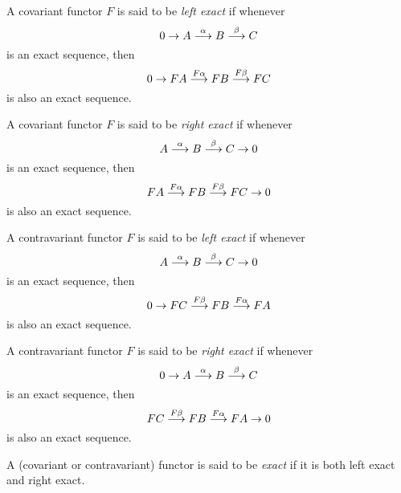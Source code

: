 \documentclass[12pt]{article}
\begin{document}
A covariant functor $F$ is said to be {\it left exact} if whenever
$$0 \to A \buildrel \alpha \over \longrightarrow B \buildrel \beta \over \longrightarrow C$$
is an exact sequence, then 
$$0 \to FA \buildrel F\alpha \over \longrightarrow FB \buildrel F\beta \over \longrightarrow FC$$
is also an exact sequence.

A covariant functor $F$ is said to be {\it right exact} if whenever
$$A \buildrel \alpha \over \longrightarrow B \buildrel \beta \over \longrightarrow C \to 0$$
is an exact sequence, then
$$FA \buildrel F\alpha \over \longrightarrow FB \buildrel F\beta \over \longrightarrow FC \to 0$$
is also an exact sequence.

A contravariant functor $F$ is said to be {\it left exact} if whenever
$$A \buildrel \alpha \over \longrightarrow B \buildrel \beta \over \longrightarrow C \to 0$$
is an exact sequence, then
$$0 \to FC \buildrel F\beta \over \longrightarrow FB \buildrel F\alpha \over \longrightarrow FA$$
is also an exact sequence.

A contravariant functor $F$ is said to be {\it right exact} if whenever
$$0 \to A \buildrel \alpha \over \longrightarrow B \buildrel \beta \over \longrightarrow C$$
is an exact sequence, then
$$FC \buildrel F\beta \over \longrightarrow FB \buildrel F\alpha \over \longrightarrow FA \to 0$$
is also an exact sequence.

A (covariant or contravariant) functor is said to be {\it exact}
if it is both left exact and right exact.
\end{document}
